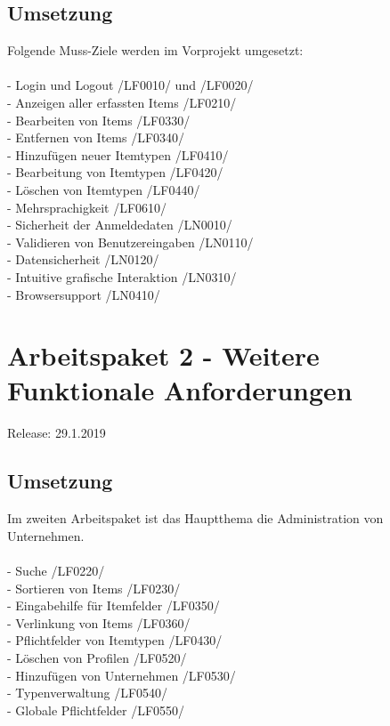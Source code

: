 \documentclass[11pt,a4paper]{report}
\begin{document}
\subsection{Umsetzung}
Folgende Muss-Ziele werden im Vorprojekt umgesetzt:\\
\\
- Login und Logout /LF0010/ und /LF0020/  \\
- Anzeigen aller erfassten Items /LF0210/ \\
- Bearbeiten von Items /LF0330/ \\
- Entfernen von Items /LF0340/ \\
- Hinzufügen neuer Itemtypen /LF0410/ \\
- Bearbeitung von Itemtypen /LF0420/ \\
- Löschen von Itemtypen /LF0440/ \\
- Mehrsprachigkeit /LF0610/ \\
- Sicherheit der Anmeldedaten /LN0010/ \\
- Validieren von Benutzereingaben /LN0110/ \\
- Datensicherheit /LN0120/ \\
- Intuitive grafische Interaktion /LN0310/ \\
- Browsersupport /LN0410/ \\

\section{Arbeitspaket 2 - Weitere Funktionale Anforderungen }
Release: 29.1.2019 \\
\subsection{Umsetzung}
Im zweiten Arbeitspaket ist das Hauptthema die Administration von Unternehmen.\\
\\
- Suche /LF0220/ \\
- Sortieren von Items /LF0230/ \\
- Eingabehilfe für Itemfelder /LF0350/ \\
- Verlinkung von Items /LF0360/ \\
- Pflichtfelder von Itemtypen /LF0430/ \\
- Löschen von Profilen /LF0520/ \\
- Hinzufügen von Unternehmen /LF0530/ \\
- Typenverwaltung /LF0540/ \\
- Globale Pflichtfelder /LF0550/ \\
\newpage
\end{document}
